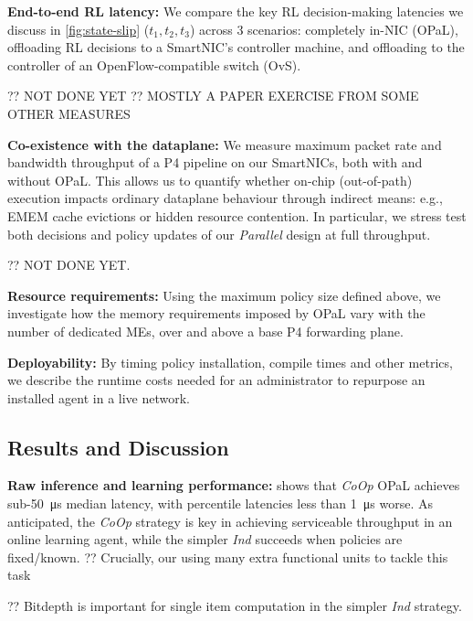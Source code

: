 \documentclass[sigconf,natbib=false]{acmart}
\newcommand{\fakepara}[1]{\noindent\textbf{#1:}}
\newcommand{\approachshort}{OPaL}
\newcommand{\Coopfw}{\emph{CoOp}}
\newcommand{\Indfw}{\emph{Ind}}
\begin{document}
\fakepara{End-to-end RL latency}
We compare the key RL decision-making latencies we discuss in \cref{fig:state-slip} ($t_1,t_2,t_3$) across 3 scenarios: completely in-NIC (\approachshort{}), offloading RL decisions to a SmartNIC's controller machine, and offloading to the controller of an OpenFlow-compatible switch (OvS).

?? NOT DONE YET
?? MOSTLY A PAPER EXERCISE FROM SOME OTHER MEASURES

\fakepara{Co-existence with the dataplane}
We measure maximum packet rate and bandwidth throughput of a P4 pipeline on our SmartNICs, both with and without \approachshort{}.
This allows us to quantify whether on-chip (out-of-path) execution impacts ordinary dataplane behaviour through indirect means: e.g., EMEM cache evictions or hidden resource contention.
In particular, we stress test both decisions and policy updates of our \emph{Parallel} design at full throughput.

?? NOT DONE YET.

\fakepara{Resource requirements}
Using the maximum policy size defined above, we investigate how the memory requirements imposed by \approachshort{} vary with the number of dedicated MEs, over and above a base P4 forwarding plane.


\fakepara{Deployability}
By timing policy installation, compile times and other metrics, we describe the runtime costs needed for an administrator to repurpose an installed agent in a live network.

\subsection{Results and Discussion}\label{sec:results}
\fakepara{Raw inference and learning performance}
 shows that \Coopfw{} \approachshort{} achieves sub-\SI{50}{\micro\second} median latency, with  percentile latencies less than \SI{1}{\micro\second} worse.
As anticipated, the \Coopfw{} strategy is key in achieving serviceable throughput in an online learning agent, while the simpler \Indfw{} succeeds when policies are fixed/known.
?? Crucially, our using many extra functional units to tackle this task

?? Bitdepth is important for single item computation in the simpler \Indfw{} strategy.
\end{document}
